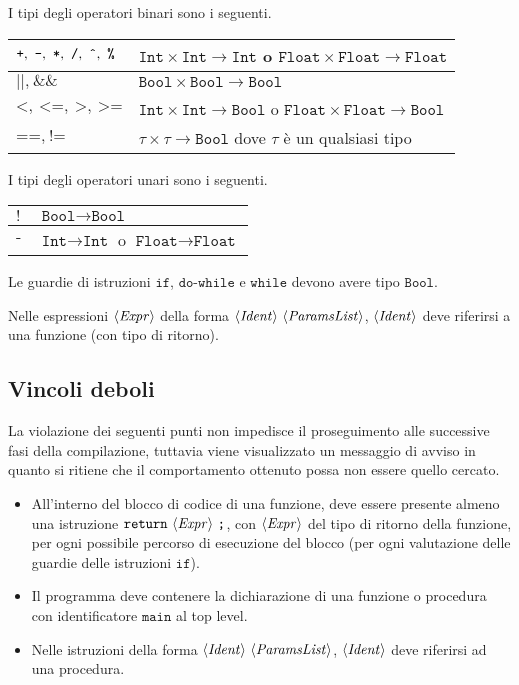I tipi degli operatori binari sono i seguenti.
\begin{table}[h]
	\centering
	\begin{tabular}{l|l}
		$\texttt{+},\ \texttt{-},\ \texttt{*},\ \texttt{/},\ \texttt{\^{}},\ \texttt{\%} $ & $\texttt{Int} \times \texttt{Int} \to \texttt{Int}$ o $\texttt{Float} \times \texttt{Float} \to \texttt{Float}$\\ \hline
		$\texttt{||},\ \texttt{\&\&} $ & $\texttt{Bool} \times \texttt{Bool} \to \texttt{Bool}$ \\ \hline
		$\texttt{<},\ \texttt{<=},\ \texttt{>},\ \texttt{>=} $ & $\texttt{Int} \times \texttt{Int} \to \texttt{Bool}$ o $\texttt{Float} \times \texttt{Float} \to \texttt{Bool}$\\ \hline
		$\texttt{==},\ \texttt{!=}$  & $\tau \times \tau \to \texttt{Bool}$ dove $\tau$ è un qualsiasi tipo
	\end{tabular}
\end{table}

I tipi degli operatori unari sono i seguenti.
\begin{table}[h]
	\centering
	\begin{tabular}{l|l}
		$\texttt{!}$ & $\texttt{Bool} \to \texttt{Bool}$\\ \hline
		$\texttt{-}$ & $\texttt{Int} \to \texttt{Int}$ o $\texttt{Float} \to \texttt{Float}$
	\end{tabular}
\end{table}

Le guardie di istruzioni $\texttt{if}$, $\texttt{do-while}$ e $\texttt{while}$ devono avere tipo $\texttt{Bool}$.

Nelle espressioni $\langle \mathit{Expr} \rangle$ della forma $\langle \mathit{Ident} \rangle\ \langle \mathit{ParamsList} \rangle$, $\langle \mathit{Ident} \rangle$ deve riferirsi a una funzione (con tipo di ritorno).

\subsection*{Vincoli deboli}
La violazione dei seguenti punti non impedisce il proseguimento alle successive fasi della compilazione, tuttavia viene visualizzato un messaggio di avviso in quanto si ritiene che il comportamento ottenuto possa non essere quello cercato.

\begin{itemize}
	\item All'interno del blocco di codice di una funzione, deve essere presente almeno una istruzione $\texttt{return}\ \langle \mathit{Expr} \rangle\ \texttt{;}$, con $\langle \mathit{Expr} \rangle$ del tipo di ritorno della funzione, per ogni possibile percorso di esecuzione del blocco (per ogni valutazione delle guardie delle istruzioni $\texttt{if}$).
	\item Il programma deve contenere la dichiarazione di una funzione o procedura con identificatore $\texttt{main}$ al top level.
	\item Nelle istruzioni della forma $\langle \mathit{Ident} \rangle\ \langle \mathit{ParamsList} \rangle$, $\langle \mathit{Ident} \rangle$ deve riferirsi ad una procedura.
\end{itemize}